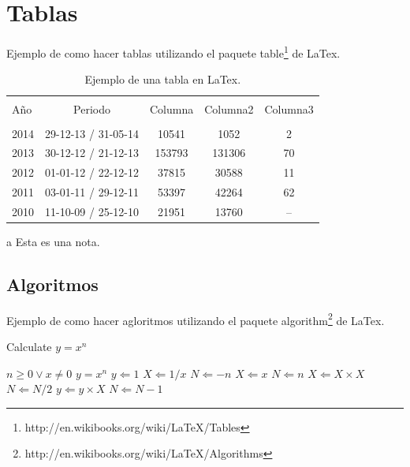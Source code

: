 \section{Tablas}
Ejemplo de como hacer tablas utilizando el paquete table\footnote{http://en.wikibooks.org/wiki/LaTeX/Tables} de LaTex.
\begin{table}[!hptb]
\begin{threeparttable}
    \begin{minipage}[b]{0.5\textwidth}
        \caption{\label{tab:tabla-ejemplo} Ejemplo de una tabla en LaTex.}
         \footnotesize
        \begin{tabular}{l c c c c}
            \hline\\
            Año & Periodo & Columna & Columna2 & Columna3\\
            \hline
            \hline\\
            2014 & 29-12-13 / 31-05-14 & 10541 & 1052 & 2\\
            2013 & 30-12-12 / 21-12-13 & 153793 & 131306 & 70\\
            2012 & 01-01-12 / 22-12-12 & 37815 & 30588 & 11\\
            2011 & 03-01-11 / 29-12-11 & 53397 & 42264 & 62\\
            2010 & 11-10-09 / 25-12-10 & 21951 & 13760 & --\tnote{a}\\
        \hline
    \end{tabular}
    \begin{tablenotes}[flushleft]\footnotesize
    \item[a]{Esta es una nota.}
    \end{tablenotes}
    \end{minipage}
    \end{threeparttable}
\end{table}


\subsection{Algoritmos}
Ejemplo de como hacer agloritmos utilizando el paquete algorithm\footnote{http://en.wikibooks.org/wiki/LaTeX/Algorithms} de LaTex.
\begin{algorithm}                      %
\caption{\label{alg:alg1}Calculate $y = x^n$}          %
\begin{algorithmic}[1]                 %
    \Require $n \geq 0 \vee x \neq 0$
    \Ensure $y = x^n$
    \State $y \Leftarrow 1$
        \State $X \Leftarrow 1 / x$
        \State $N \Leftarrow -n$
    \Else
        \State $X \Leftarrow x$
        \State $N \Leftarrow n$
    \EndIf
            \State $X \Leftarrow X \times X$
            \State $N \Leftarrow N / 2$
        \Else[$N$ is odd]
            \State $y \Leftarrow y \times X$
            \State $N \Leftarrow N - 1$
        \EndIf
    \EndWhile
\end{algorithmic}
\end{algorithm}

